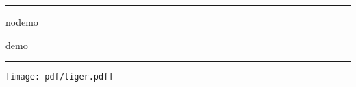 \documentclass[a4paper,\myClassOptions]{article}
\begin{document}
\hrule
\begin{description}
  \Large
  \item[graphicx:] nodemo
  \item[pdfpages:] demo
\end{description}
\hrule

\tableofcontents
\texttt{[image: pdf/tiger.pdf]}


\end{document}
